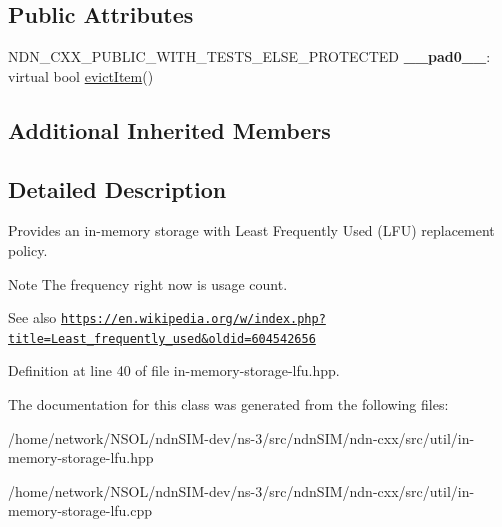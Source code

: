 \subsection*{Public Attributes}
\begin{DoxyCompactItemize}
\item 
N\+D\+N\+\_\+\+C\+X\+X\+\_\+\+P\+U\+B\+L\+I\+C\+\_\+\+W\+I\+T\+H\+\_\+\+T\+E\+S\+T\+S\+\_\+\+E\+L\+S\+E\+\_\+\+P\+R\+O\+T\+E\+C\+T\+ED {\bfseries \+\_\+\+\_\+pad0\+\_\+\+\_\+}\+: virtual bool \hyperlink{classndn_1_1util_1_1InMemoryStorage_a14036928e195645bf47d8c5686277fd8}{evict\+Item}()\hypertarget{classndn_1_1util_1_1InMemoryStorageLfu_a2f1bc55c9745692241d0ade969c3b8e7}{}\label{classndn_1_1util_1_1InMemoryStorageLfu_a2f1bc55c9745692241d0ade969c3b8e7}

\end{DoxyCompactItemize}
\subsection*{Additional Inherited Members}


\subsection{Detailed Description}
Provides an in-\/memory storage with Least Frequently Used (L\+FU) replacement policy. 

\begin{DoxyNote}{Note}
The frequency right now is usage count. 
\end{DoxyNote}
\begin{DoxySeeAlso}{See also}
\href{https://en.wikipedia.org/w/index.php?title=Least_frequently_used&oldid=604542656}{\tt https\+://en.\+wikipedia.\+org/w/index.\+php?title=\+Least\+\_\+frequently\+\_\+used\&oldid=604542656} 
\end{DoxySeeAlso}


Definition at line 40 of file in-\/memory-\/storage-\/lfu.\+hpp.



The documentation for this class was generated from the following files\+:\begin{DoxyCompactItemize}
\item 
/home/network/\+N\+S\+O\+L/ndn\+S\+I\+M-\/dev/ns-\/3/src/ndn\+S\+I\+M/ndn-\/cxx/src/util/in-\/memory-\/storage-\/lfu.\+hpp\item 
/home/network/\+N\+S\+O\+L/ndn\+S\+I\+M-\/dev/ns-\/3/src/ndn\+S\+I\+M/ndn-\/cxx/src/util/in-\/memory-\/storage-\/lfu.\+cpp\end{DoxyCompactItemize}
